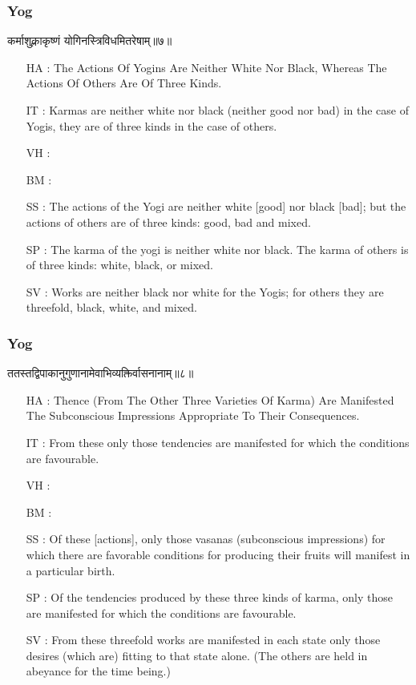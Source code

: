 \begin{frame}[fragile]\frametitle{Yog}
\begin{sanskrit}
कर्माशुक्लाकृष्णं योगिनस्त्रिविधमितरेषाम्॥७॥
\end{sanskrit}

	\begin{itemize}
	\item [HA]: The Actions Of Yogins Are Neither White Nor Black, Whereas The Actions Of Others Are Of Three Kinds.
	\item [IT]: Karmas are neither white nor black (neither good nor bad) in the case of Yogis, they are of three kinds in the case of others.
	\item [VH]: 
	\item [BM]: 
	\item [SS]: The actions of the Yogi are neither white [good] nor black [bad]; but the actions of others are of three kinds: good, bad and mixed.
	\item [SP]: The karma of the yogi is neither white nor black. The karma of others is of three kinds: white, black, or mixed.
	\item [SV]: Works are neither black nor white for the Yogis; for others they are threefold, black, white, and mixed.
	\end{itemize}
\end{frame}


\begin{frame}[fragile]\frametitle{Yog}
\begin{sanskrit}
ततस्तद्विपाकानुगुणानामेवाभिव्यक्तिर्वासनानाम्॥८॥
\end{sanskrit}

	\begin{itemize}
	\item [HA]: Thence (From The Other Three Varieties Of Karma) Are Manifested The Subconscious Impressions Appropriate To Their Consequences.
	\item [IT]: From these only those tendencies are manifested for which the conditions are favourable.
	\item [VH]: 
	\item [BM]: 
	\item [SS]: Of these [actions], only those vasanas (subconscious impressions) for which there are favorable conditions for producing their fruits will manifest in a particular birth.
	\item [SP]: Of the tendencies produced by these three kinds of karma, only those are manifested for which the conditions are favourable.
	\item [SV]: From these threefold works are manifested in each state only those desires (which are) fitting to that state alone. (The others are held in abeyance for the time being.) 
	\end{itemize}
\end{frame}

